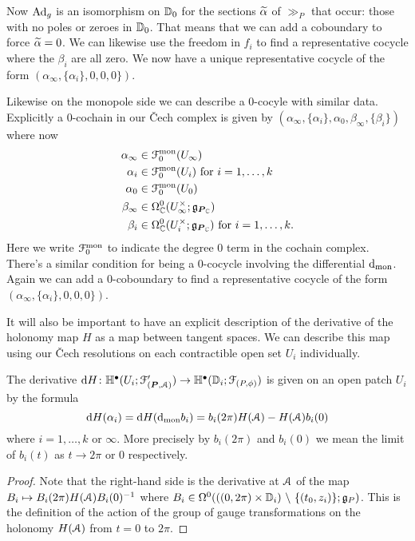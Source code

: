 \documentclass[10pt, oneside]{article}
\renewcommand{\d}{\mathrm{d}}
\begin{document}
Now $\mathrm{Ad}_g$ is an isomorphism on $\mathbb{D}_0$ for the sections $\widetilde{\alpha}$ of $\gg_P$ that occur: those with no poles or zeroes in $\mathbb{D}_0$.  That means that we can add a coboundary to force $\widetilde{\alpha}=0$.  We can likewise use the freedom in $f_i$ to find a representative cocycle where the $\beta_i$ are all zero.  We now have a unique representative cocycle of the form $(\alpha_\infty, \{\alpha_i\}, 0,0,0\})$.

Likewise on the monopole side we can describe a 0-cocyle with similar data.  Explicitly a 0-cochain in our \v Cech complex is given by $(\alpha_\infty, \{\alpha_i\}, \alpha_0, \beta_\infty, \{\beta_i\})$ where now 
\begin{align*}
 \alpha_\infty &\in \mathcal{F}^{\mathrm{mon}}_0(U_\infty) \\
 \alpha_i &\in \mathcal{F}^{\mathrm{mon}}_0(U_i) \text{ for } i = 1,\ldots,k \\
 \alpha_0 &\in \mathcal{F}^{\mathrm{mon}}_0(U_0) \\
 \beta_\infty &\in \Omega^0_{\mathbb{C}}(U_\infty^\times; \mathfrak{g}_{\boldsymbol{P}_{\mathbb{C}}}) \\
 \beta_i &\in \Omega^0_{\mathbb{C}}(U_i^\times; \mathfrak{g}_{\boldsymbol{P}_{\mathbb{C}}}) \text{ for } i=1,\ldots,k.
\end{align*}
Here we write $\mathcal{F}^{\mathrm{mon}}_0$ to indicate the degree 0 term in the cochain complex.  There's a similar condition for being a 0-cocycle involving the differential $\d_{\mr{mon}}$.  Again we can add a 0-coboundary to find a representative cocycle of the form $(\alpha_\infty, \{\alpha_i\}, 0,0,0\})$.

It will also be important to have an explicit description of the derivative of the holonomy map $H$ as a map between tangent spaces.  We can describe this map using our \v Cech resolutions on each contractible open set $U_i$ individually.




\begin{prop} \label{local_derivative_description_prop}
The derivative $\d H \colon \bb H^\bullet(U_i ; \mc F'_{(\bo P,\mc A)}) \to \bb H^\bullet(\bb D_i; \mc F_{(P,\phi)})$ is given on an open patch $U_i$ by the formula
\[\d H(\alpha_i) = \d H(\d_{\mr{mon}} b_i) = b_i(2\pi)H(\mc A) - H(\mc A)b_i(0)\]
where $i = 1, \ldots, k$ or $\infty$.  More precisely by $b_i(2\pi)$ and $b_i(0)$ we mean the limit of $b_i(t)$ as $t \to 2\pi$ or 0 respectively.
\end{prop}

\begin{proof}
Note that the right-hand side is the derivative at $\mathcal{A}$ of the map $B_i \mapsto B_i(2\pi)H(\mathcal{A})B_i(0)^{-1}$ where $B_i \in \Omega^0(((0,2\pi) \times \mathbb{D}_i) \ \backslash \  \{(t_0,z_i)\}; \mathfrak{g}_P)$.  This is the definition of the action of the group of gauge transformations on the holonomy $H(\mathcal{A})$ from $t=0$ to $2\pi$. 
\end{proof}
\end{document}
